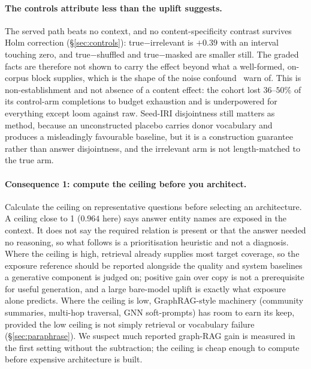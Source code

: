 \documentclass[10pt,twocolumn]{article}
\begin{document}
\paragraph{The controls attribute less than the uplift suggests.} The served path beats no context, and no content-specificity contrast survives Holm correction (\S\ref{sec:controls}): true$-$irrelevant is $+0.39$ with an interval touching zero, and true$-$shuffled and true$-$masked are smaller still. The graded facts are therefore not shown to carry the effect beyond what a well-formed, on-corpus block supplies, which is the shape of the noise confound~\textcite{cuconasu2024poweofnoise} warn of. This is non-establishment and not absence of a content effect: the cohort lost $36$--$50\%$ of its control-arm completions to budget exhaustion and is underpowered for everything except loom against raw. Seed-IRI disjointness still matters as method, because an unconstructed placebo carries donor vocabulary and produces a misleadingly favourable baseline, but it is a construction guarantee rather than answer disjointness, and the irrelevant arm is not length-matched to the true arm.

\paragraph{Consequence 1: compute the ceiling before you architect.}
Calculate the ceiling on representative questions before selecting an architecture. A ceiling close to 1 ($0.964$ here) says answer entity names are exposed in the context. It does not say the required relation is present or that the answer needed no reasoning, so what follows is a prioritisation heuristic and not a diagnosis. Where the ceiling is high, retrieval already supplies most target coverage, so the exposure reference should be reported alongside the quality and system baselines a generative component is judged on; positive gain over copy is not a prerequisite for useful generation, and a large bare-model uplift is exactly what exposure alone predicts. Where the ceiling is low, GraphRAG-style machinery (community summaries, multi-hop traversal, GNN soft-prompts) has room to earn its keep, provided the low ceiling is not simply retrieval or vocabulary failure (\S\ref{sec:paraphrase}). We suspect much reported graph-RAG gain is measured in the first setting without the subtraction; the ceiling is cheap enough to compute before expensive architecture is built.
\end{document}
